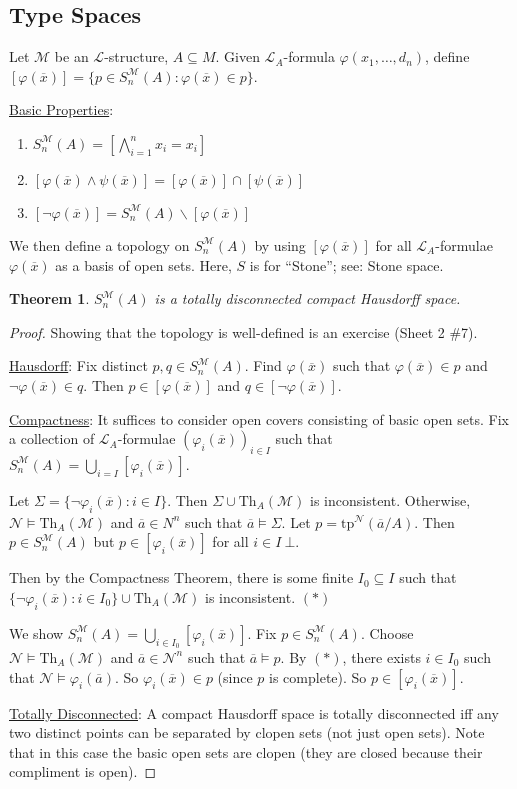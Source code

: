 \documentclass[]{article}
\theoremstyle{custhm}
\newtheorem{theorem}{Theorem}[section]
\theoremstyle{cusdef}
\theoremstyle{custhm}
\theoremstyle{custhm}
\theoremstyle{custhm}
\theoremstyle{ex}
\theoremstyle{custhm}
\theoremstyle{cusdef}
\theoremstyle{remark}
\theoremstyle{remark}
\theoremstyle{numremark}
\renewcommand{\L}{\mathcal{L}}
\newcommand{\M}{\mathcal{M}}
\renewcommand{\phi}{\varphi}
\renewcommand{\bar}{\overline}
\newcommand{\Th}{\textrm{Th}}
\newcommand{\tp}{\textrm{tp}}
\newcommand{\false}{\bot}
\newcommand{\N}{\mathcal{N}}
\newcommand{\sman}{S_n^\M(A)}
\renewcommand{\subset}{\subseteq}
\begin{document}
\subsection*{Type Spaces}

Let $\M$ be an $\L$-structure, $A\subset M$. Given $\L_A$-formula $\phi(x_1,\dots,d_n)$, define $[\phi(\bar{x})] = \{p \in S_n^\M(A):\phi(\bar{x}) \in p\}$.

\underline{Basic Properties}:
\begin{enumerate}[label = \arabic*.]
	\item $\sman = \left[\bigwedge_{i=1}^{n}x_i = x_i\right]$
	\item $\left[\phi(\bar{x})\land\psi(\bar{x})\right] = [\phi(\bar{x})]\cap [\psi(\bar{x})]$
	\item $\left[\neg \phi(\bar{x})\right] = \sman\backslash \left[\phi(\bar{x})\right]$
\end{enumerate}
We then define a topology on $\sman$ by using $[\phi(\bar{x})]$ for all $\L_A$-formulae $\phi(\bar{x})$ as a basis of open sets. Here, $S$ is for ``Stone''; see: Stone space.

\begin{theorem}
$\sman$ is a totally disconnected compact Hausdorff space.
\end{theorem}
\begin{proof}
Showing that the topology is well-defined is an exercise (Sheet 2 \#7).

\underline{Hausdorff}: Fix distinct $p,q \in \sman$. Find $\phi(\bar{x})$ such that $\phi(\bar{x}) \in p$ and $\neg\phi(\bar{x}) \in q$. Then $p \in [\phi(\bar{x})]$ and $q \in [\neg \phi(\bar{x})]$.

\underline{Compactness}: It suffices to consider open covers consisting of basic open sets. Fix a collection of $\L_A$-formulae $(\phi_i(\bar{x}))_{i\in I}$ such that $\sman = \bigcup_{i=I}\left[\phi_i(\bar{x})\right]$.

Let $\Sigma = \{\neg \phi_i(\bar{x}):i\in I\}$. Then $\Sigma \cup \Th_A(\M)$ is inconsistent. Otherwise, $\N\models \Th_A(\M)$ and $\bar{a}\in N^n$ such that $\bar{a} \models \Sigma$. Let $p = \tp^\N(\bar{a}/A)$. Then $p \in \sman$ but $p \in [\phi_i(\bar{x})]$ for all $i \in I\ \false$.

Then by the Compactness Theorem, there is some finite $I_0 \subset I$ such that $\{\neg \phi_i(\bar{x}):i\in I_0\}\cup\Th_A(\M)$ is inconsistent. $(\ast)$

We show $\sman = \bigcup_{i\in I_0}[\phi_i(\bar{x})]$. Fix $p \in \sman$. Choose $\N\models \Th_A(\M)$ and $\bar{a} \in \N^n$ such that $\bar{a}\models p$. By $(\ast)$, there exists $i \in I_0$ such that $\N\models \phi_i(\bar{a})$. So $\phi_i(\bar{x})\in p$ (since $p$ is complete). So $p \in [\phi_i(\bar{x})]$.

\underline{Totally Disconnected}: A compact Hausdorff space is totally disconnected iff any two distinct  points can be separated by clopen sets (not just open sets). Note that in this case the basic open sets are clopen (they are closed because their compliment is open).
\end{proof}
\end{document}
